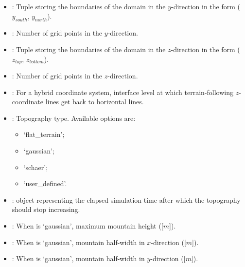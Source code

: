 \documentclass[letterpaper,10pt,english]{sphinxmanual}
\begin{document}
\begin{description}
\begin{itemize}
\item {} 
: Tuple storing the boundaries of the domain in the \(y\)-direction              in the form (\(y_{south}\), \(y_{north}\)).

\item {} 
: Number of grid points in the \(y\)-direction.

\item {} 
: Tuple storing the boundaries of the domain in the \(z\)-direction              in the form (\(z_{top}\), \(z_{bottom}\)).

\item {} 
: Number of grid points in the \(z\)-direction.

\item {} 
: For a hybrid coordinate system, interface level at which terrain-following              \(z\)-coordinate lines get back to horizontal lines.

\item {} 
: Topography type. Available options are:
\begin{itemize}
\item {} 
‘flat\_terrain’;

\item {} 
‘gaussian’;

\item {} 
‘schaer’;

\item {} 
‘user\_defined’.

\end{itemize}

\item {} 
:  object representing the elapsed simulation time                               after which the topography should stop increasing.

\item {} 
: When  is ‘gaussian’, maximum mountain height ({[}\(m\){]}).

\item {} 
: When  is ‘gaussian’, mountain half-width in \(x\)-direction             ({[}\(m\){]}).

\item {} 
: When  is ‘gaussian’, mountain half-width in \(y\)-direction             ({[}\(m\){]}).


\end{itemize}
\end{description}
\end{document}
